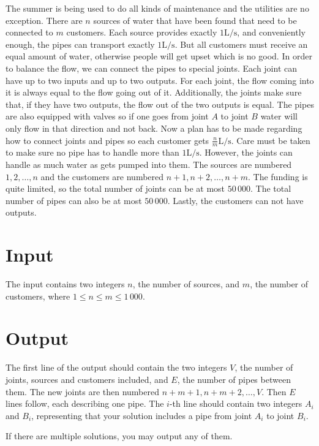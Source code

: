 
The summer is being used to do all kinds of maintenance and the utilities are no exception.
There are $n$ sources of water that have been found that need to be connected to $m$ customers.
Each source provides exactly $1 \mathrm{L/s}$, and conveniently enough, the pipes can transport exactly $1 \mathrm{L/s}$.
But all customers must receive an equal amount of water, otherwise people will get upset which is no good.
In order to balance the flow, we can connect the pipes to special joints.
Each joint can have up to two inputs and up to two outputs.
For each joint, the flow coming into it is always equal to the flow going out of it.
Additionally, the joints make sure that, if they have two outputs, the flow out of the two outputs is equal.
The pipes are also equipped with valves so if one goes from joint $A$ to joint $B$ water will only flow in that direction and not back.
Now a plan has to be made regarding how to connect joints and pipes so each customer gets $\frac{n}{m} \mathrm{L/s}$.
Care must be taken to make sure no pipe has to handle more than $1 \mathrm{L/s}$.
However, the joints can handle as much water as gets pumped into them.
The sources are numbered $1, 2, \dots, n$ and the customers are numbered $n + 1, n + 2, \dots, n + m$.
The funding is quite limited, so the total number of joints can be at most $50\,000$.
The total number of pipes can also be at most $50\,000$.
Lastly, the customers can not have outputs.

\section*{Input}
The input contains two integers $n$, the number of sources, and $m$, the number of customers, where $1 \leq n \leq m \leq 1\,000$.

\section*{Output}
The first line of the output should contain the two integers $V$, the number of joints, sources and customers included, and $E$, the number
of pipes between them.
The new joints are then numbered $n + m + 1, n + m + 2, \dots, V$.
Then $E$ lines follow, each describing one pipe.
The $i$-th line should contain two integers $A_i$ and $B_i$, representing that your solution includes a pipe from joint $A_i$ to joint $B_i$.

If there are multiple solutions, you may output any of them.
